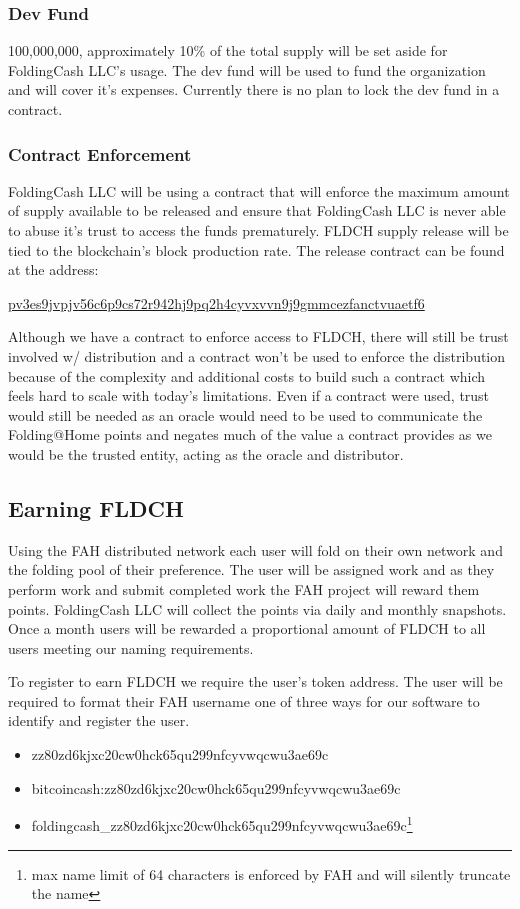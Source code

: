 \documentclass[letterpaper,12pt,titlepage]{article}
\def\org{FoldingCash LLC}
\def\ticker{FLDCH}
\def\devfund{100,000,000}
\def\releaseContract{\href{https://explorer.electroncash.de/address/bitcoincash:pv3es9jvpjv56c6p9cs72r942hj9pq2h4cyvxvvn9j9gmmcezfanctvuaetf6}{pv3es9jvpjv56c6p9cs72r942hj9pq2h4cyvxvvn9j9gmmcezfanctvuaetf6}}
\begin{document}
\subsubsection{Dev Fund}
\devfund{}, approximately 10\% of the total supply will be set aside for \org{'s} usage. The dev fund will be used to fund the organization and will cover it's expenses. Currently there is no plan to lock the dev fund in a contract.

\subsubsection{Contract Enforcement}
\org{} will be using a contract that will enforce the maximum amount of supply available to be released and ensure that \org{} is never able to abuse it's trust to access the funds prematurely. \ticker{} supply release will be tied to the blockchain's block production rate. The release contract can be found at the address:

\releaseContract{}

Although we have a contract to enforce access to \ticker{}, there will still be trust involved w/ distribution and a contract won't be used to enforce the distribution because of the complexity and additional costs to build such a contract which feels hard to scale with today's limitations. Even if a contract were used, trust would still be needed as an oracle would need to be used to communicate the Folding@Home points and negates much of the value a contract provides as we would be the trusted entity, acting as the oracle and distributor.

\subsection{Earning \ticker{}}
Using the FAH distributed network each user will fold on their own network and the folding pool of their preference. The user will be assigned work and as they perform work and submit completed work the FAH project will reward them points. \org{} will collect the points via daily and monthly snapshots. Once a month users will be rewarded a proportional amount of \ticker{} to all users meeting our naming requirements.

To register to earn \ticker{} we require the user's token address. The user will be required to format their FAH username one of three ways for our software to identify and register the user.

\begin{itemize}
    \item zz80zd6kjxc20cw0hck65qu299nfcyvwqcwu3ae69c
    \item bitcoincash:zz80zd6kjxc20cw0hck65qu299nfcyvwqcwu3ae69c
    \item foldingcash\_zz80zd6kjxc20cw0hck65qu299nfcyvwqcwu3ae69c\footnote{max name limit of 64 characters is enforced by FAH and will silently truncate the name}
\end{itemize}
\end{document}
